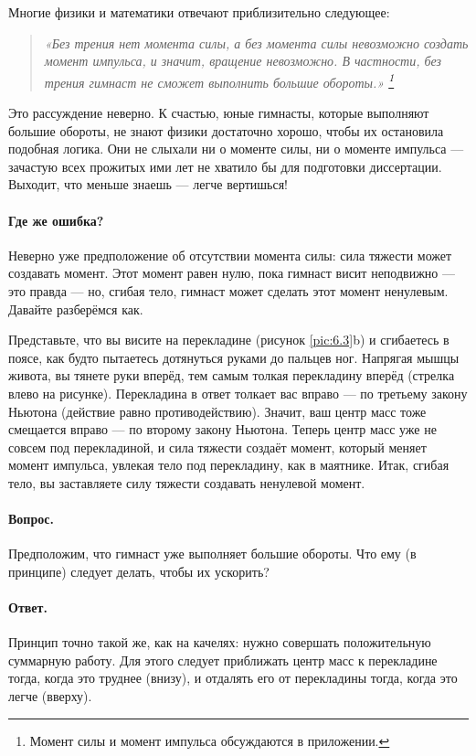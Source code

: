 Многие физики и математики отвечают приблизительно следующее:
\begin{quote}
\emph{«Без трения нет момента силы, а без момента силы невозможно создать момент импульса,
и значит, вращение невозможно.
В частности, без трения гимнаст не сможет выполнить большие обороты.»%
\footnote{Момент силы и момент импульса обсуждаются в приложении.}}
\end{quote}

Это рассуждение неверно.
К счастью, юные гимнасты, которые выполняют большие обороты, не знают физики достаточно хорошо, чтобы их остановила подобная логика.
Они не слыхали ни о моменте силы, ни о моменте импульса ---
зачастую всех прожитых ими лет не хватило бы для подготовки диссертации.
Выходит, что меньше знаешь --- легче вертишься!

\paragraph{Где же ошибка?}
Неверно уже предположение об отсутствии момента силы: сила тяжести может создавать момент.
Этот момент равен нулю, пока гимнаст висит неподвижно --- это правда --- но, сгибая тело, гимнаст может сделать этот момент ненулевым.
Давайте разберёмся как.

Представьте, что вы висите на перекладине (рисунок \ref{pic:6.3}b) и сгибаетесь в поясе, как будто пытаетесь дотянуться руками до пальцев ног.
Напрягая мышцы живота, вы тянете руки вперёд, тем самым толкая перекладину вперёд (стрелка влево на рисунке).
Перекладина в ответ толкает вас вправо --- по третьему закону Ньютона (действие равно противодействию).
Значит, ваш центр масс тоже смещается вправо --- по второму закону Ньютона.
Теперь центр масс уже не совсем под перекладиной,
и сила тяжести создаёт момент, который меняет момент импульса,
увлекая тело под перекладину, как в маятнике.
Итак, сгибая тело, вы заставляете силу тяжести создавать ненулевой момент.

\paragraph{Вопрос.}
Предположим, что гимнаст уже выполняет большие обороты.
Что ему (в принципе) следует делать, чтобы их ускорить?

\paragraph{Ответ.}
Принцип точно такой же, как на качелях: нужно совершать положительную суммарную работу.
Для этого следует приближать центр масс к перекладине тогда, когда это труднее (внизу), и отдалять его от перекладины тогда, когда это легче (вверху).

